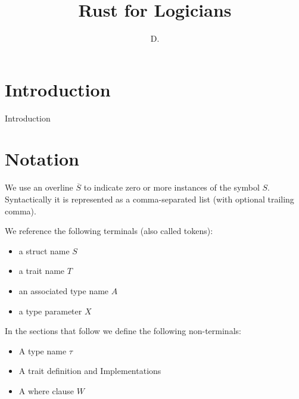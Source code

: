 \documentclass[sn-mathphys-num]{sn-jnl}%
\theoremstyle{thmstyleone}%
\theoremstyle{thmstyletwo}%
\theoremstyle{thmstylethree}%
\begin{document}
\title[Rust for Logicians]{Rust for Logicians}


\author{ D. }




\maketitle

\section{Introduction}\label{sec1}

Introduction

\section{Notation}

We use an overline $\overline{S}$ to indicate zero or more instances of the symbol $S$.
Syntactically it is represented as a comma-separated list (with optional trailing comma).

We reference the following terminals (also called tokens):

\begin{itemize}
    \item a struct name $S$
    \item a trait name $T$
    \item an associated type name $A$
    \item a type parameter $X$
\end{itemize}

In the sections that follow we define the following non-terminals:

\begin{itemize}
    \item A type name $\tau$
    \item A trait definition and Implementations
    \item A where clause $W$
\end{itemize}
\end{document}
